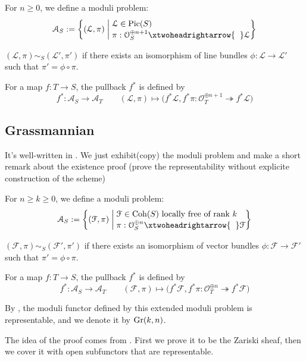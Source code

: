 \begin{eg}
For $n \geqslant 0$, we define a moduli problem:
$$\mathcal{A}_S:=\left\{(\mathcal{L},\pi)  \;\middle|\; \begin{aligned}
&\\[-5mm]
&\mathcal{L} \in \Pic(S)\\[-1mm]
& \pi:\mathcal{O}_S^{\oplus n+1} \xtwoheadrightarrow{\hspace{2mm}}  \mathcal{L}
\end{aligned}
 \right\}$$
 
   $(\mathcal{L},\pi) \sim_S (\mathcal{L}',\pi')$ if there exists an isomorphism of line bundles $\phi:\mathcal{L} \longrightarrow \mathcal{L}'$ such that $\pi'=\phi \circ \pi$.
   
   For a map $f:T \longrightarrow S$, the pullback $f^*$ is defined by
      $$f^*:\mathcal{A}_S \longrightarrow \mathcal{A}_T \qquad (\mathcal{L},\pi) \longmapsto \big(f^*\mathcal{L},f^* \pi:\mathcal{O}_T^{\oplus n+1} \twoheadrightarrow f^*\mathcal{L}\big)$$
\end{eg}
\subsection{Grassmannian}
It's well-written in \cite[16.7]{FOAG}. We just exhibit(copy) the moduli problem and make a short remark about the existence proof (prove the representability without explicite construction of the scheme)
\begin{eg}[{Grassmannian $\Gr(k,n)$}]
For $n \geqslant k \geqslant 0$, we define a moduli problem:
$$\mathcal{A}_S:=\left\{(\mathcal{F},\pi)  \;\middle|\; \begin{aligned}
&\\[-5mm]
&\mathcal{F} \in \Coh(S) \text{ locally free of rank $k$ }\\[-1mm]
& \pi:\mathcal{O}_S^{\oplus n} \xtwoheadrightarrow{\hspace{2mm}}  \mathcal{F}
\end{aligned}
 \right\}$$
 
   $(\mathcal{F},\pi) \sim_S (\mathcal{F}',\pi')$ if there exists an isomorphism of vector bundles $\phi:\mathcal{F} \longrightarrow \mathcal{F}'$ such that $\pi'=\phi \circ \pi$.
   
   For a map $f:T \longrightarrow S$, the pullback $f^*$ is defined by
      $$f^*:\mathcal{A}_S \longrightarrow \mathcal{A}_T \qquad (\mathcal{F},\pi) \longmapsto \big(f^*\mathcal{F},f^* \pi:\mathcal{O}_T^{\oplus n} \twoheadrightarrow f^*\mathcal{F}\big)$$
      
      By \cite[16.7, page 442-443]{FOAG}, the moduli functor defined by this extended moduli problem is representable, and we denote it by $\Gr(k,n)$.
\end{eg}
\begin{remark}
The idea of the proof comes from \cite[9.1.I]{FOAG}. First we prove it to be the Zariski sheaf, then we cover it with open subfunctors that are representable.
\end{remark}


